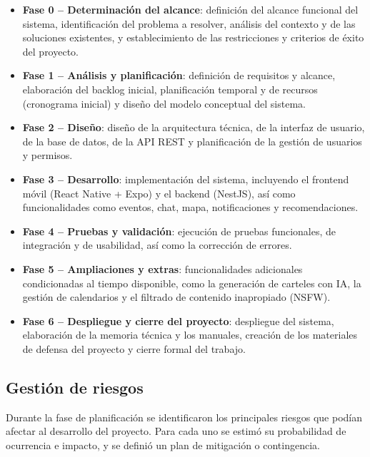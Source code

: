 \begin{itemize}
    \item \textbf{Fase 0 – Determinación del alcance}: definición del alcance funcional del sistema, identificación del problema a resolver, análisis del contexto y de las soluciones existentes, y establecimiento de las restricciones y criterios de éxito del proyecto.

    \item \textbf{Fase 1 – Análisis y planificación}: definición de requisitos y alcance, elaboración del backlog inicial, planificación temporal y de recursos (cronograma inicial) y diseño del modelo conceptual del sistema.

    \item \textbf{Fase 2 – Diseño}: diseño de la arquitectura técnica, de la interfaz de usuario, de la base de datos, de la API REST y planificación de la gestión de usuarios y permisos.

    \item \textbf{Fase 3 – Desarrollo}: implementación del sistema, incluyendo el frontend móvil (React Native + Expo) y el backend (NestJS), así como funcionalidades como eventos, chat, mapa, notificaciones y recomendaciones.

    \item \textbf{Fase 4 – Pruebas y validación}: ejecución de pruebas funcionales, de integración y de usabilidad, así como la corrección de errores.

    \item \textbf{Fase 5 – Ampliaciones y extras}: funcionalidades adicionales condicionadas al tiempo disponible, como la generación de carteles con IA, la gestión de calendarios y el filtrado de contenido inapropiado (NSFW).

    \item \textbf{Fase 6 – Despliegue y cierre del proyecto}: despliegue del sistema, elaboración de la memoria técnica y los manuales, creación de los materiales de defensa del proyecto y cierre formal del trabajo.
\end{itemize}

\subsection{Gestión de riesgos}

Durante la fase de planificación se identificaron los principales riesgos que podían afectar al desarrollo del proyecto. Para cada uno se estimó su probabilidad de ocurrencia e impacto, y se definió un plan de mitigación o contingencia.

